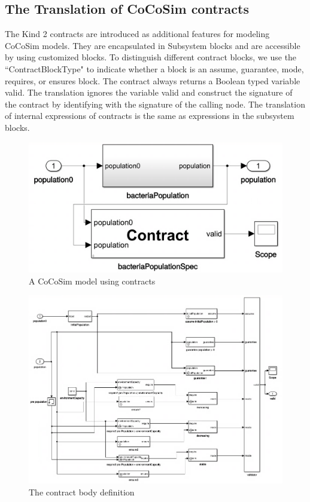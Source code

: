 \documentclass{article}
\begin{document}
\subsection{The Translation of CoCoSim contracts}
The Kind 2 contracts are introduced as additional features for modeling CoCoSim models.
They are encapsulated in \textsf{Subsystem} blocks and are accessible by using customized 
blocks.
To distinguish different contract blocks, we use the \textsf{``ContractBlockType"} to indicate whether a block 
is an \textsf{assume}, \textsf{guarantee}, \textsf{mode}, \textsf{requires}, or \textsf{ensures} block.
The contract always returns a Boolean typed variable \textsf{valid}.
The translation ignores the variable \textsf{valid} and construct the signature 
of the contract by identifying with the signature of the calling node.
The translation of internal expressions of contracts is the same as expressions in the subsystem blocks.


\begin{figure}[h]
\begin{center}
  \includegraphics[scale=0.2]{figures/contract}    
\end{center}  
  \caption{A CoCoSim model using contracts}
  \label{contractmodel}
\end{figure}

\begin{figure}[h]
\begin{center}
  \includegraphics[scale=0.5]{figures/contract1}    
\end{center}  
  \caption{The contract body definition}
  \label{contractdef}
\end{figure}
\end{document}
